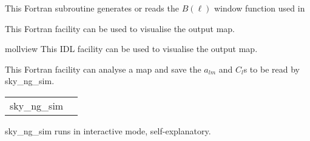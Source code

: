 \begin{support}
  \begin{sulist}{} %
  \item[\htmlref{generate\_beam}{sub:generate_beam}] This \healpix Fortran
subroutine generates or reads the $B(\ell)$ window function used in \thedocid
  \item[\htmlref{map2gif}{fac:map2gif}] This \healpix Fortran facility can be used to visualise the
  output map.
  \item[mollview] This \healpix IDL facility can be used to visualise the
  output map.
  \item[\htmlref{anafast}{fac:anafast}] This \healpix Fortran facility can analyse a \healpix map and 
     	       save the $a_{lm}$ and $C_l$s to be read by sky\_ng\_sim.
		
  \end{sulist}
\end{support}

\begin{examples}{1}
{
\begin{tabular}{ll} %
sky\_ng\_sim  \\
\end{tabular}
}
{
sky\_ng\_sim runs in interactive mode, self-explanatory.
}
\end{examples}



